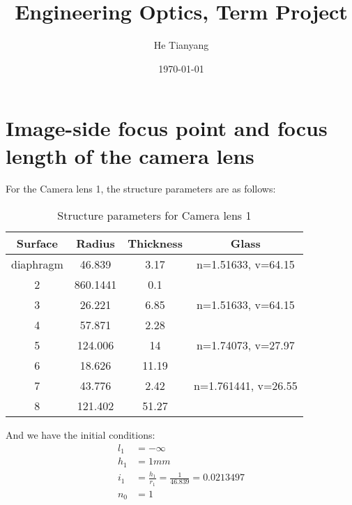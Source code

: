 \documentclass{article}
\title{Engineering Optics, Term Project}
\author{He Tianyang}
\date{\today}
\begin{document}
\maketitle

\section{Image-side focus point and focus length of the camera lens}

For the Camera lens 1, the structure parameters are as follows:
\begin{table}[H]
    \centering
    \begin{tabular}{cccc}
        \hline
        \textbf{Surface} & \textbf{Radius} & \textbf{Thickness} & \textbf{Glass}      \\
        \hline
        diaphragm        & 46.839          & 3.17               & n=1.51633, v=64.15  \\
        2                & 860.1441        & 0.1                &                     \\
        3                & 26.221          & 6.85               & n=1.51633, v=64.15  \\
        4                & 57.871          & 2.28               &                     \\
        5                & 124.006         & 14                 & n=1.74073, v=27.97  \\
        6                & 18.626          & 11.19              &                     \\
        7                & 43.776          & 2.42               & n=1.761441, v=26.55 \\
        8                & 121.402         & 51.27              &                     \\
        \hline
    \end{tabular}
    \caption{Structure parameters for Camera lens 1}
    \label{tab:camera1}
\end{table}

And we have the initial conditions:
\begin{align*}
    l_1 & = -\infty                                   \\
    h_1 & =1mm                                        \\
    i_1 & =\frac{h_1}{r_1}=\frac{1}{46.839}=0.0213497 \\
    n_0 & = 1
\end{align*}
\end{document}

